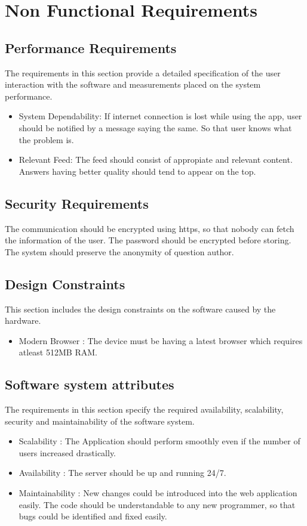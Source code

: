 \documentclass[journal,12pt,onecolumn,draftclsnofoot,]{IEEEtran}
\begin{document}
\section{Non Functional Requirements}


\subsection{Performance Requirements}
The requirements in this section provide a detailed specification of the user interaction with the software and measurements placed on the system performance.
\begin{itemize}
\item System Dependability: If internet connection is lost while using the app, user should be notified by a message saying the same. So that user knows what the problem is.
\item Relevant Feed: The feed should consist of appropiate and relevant content. Answers having better quality should tend to appear on the top.
\end{itemize}

\subsection{Security Requirements}
The communication should be encrypted using https, so that nobody can fetch the information of the user. The password should be encrypted before storing. The system should preserve the anonymity of question author.

\subsection{Design Constraints}
This section includes the design constraints on the software caused by the hardware.
\begin{itemize}
\item Modern Browser : The device must be having a latest browser which requires atleast 512MB RAM.
\end{itemize}

\subsection{Software system attributes}
The requirements in this section specify the required availability, scalability, security and maintainability of the software system.
\begin{itemize}
\item Scalability : The Application should perform smoothly even if the number of users increased drastically.
\item Availability : The server should be up and running 24/7.
\item Maintainability : New changes could be introduced into the web application easily. The code should be understandable to any new programmer, so that bugs could be identified and fixed easily.
\end{itemize}
\end{document}
